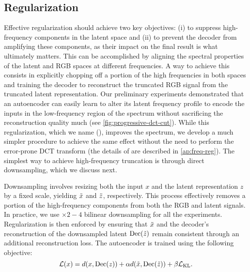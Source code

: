 


\subsection{\Regname Regularization}
\label{sec:method:scalereg}
Effective regularization should achieve two key objectives: (i) to suppress high-frequency components in the latent space and (ii) to prevent the decoder from amplifying these components, as their impact on the final result is what ultimately matters. This can be accomplished by aligning the spectral properties of the latent and RGB spaces at different frequencies.
A way to achieve this consists in explicitly chopping off a portion of the high frequencies in both spaces and training the decoder to reconstruct the truncated RGB signal from the truncated latent representation.
Our preliminary experiments demonstrated that an autoencoder can easily learn to alter its latent frequency profile to encode the inputs in the low-frequency region of the spectrum without sacrificing the reconstruction quality much (see \cref{fig:progressive-dct-cut}).
While this regularization, which we name \regchfname (\regchfshortname), improves the spectrum, we develop a much simpler procedure to achieve the same effect without the need to perform the error-prone DCT transform (the details of \regchfshortname are described in \cref{ap:freq-reg}).
The simplest way to achieve high-frequency truncation is through direct downsampling, which we discuss next.

Downsampling involves resizing both the input  $x$ and the latent representation $z$ by a fixed scale, yielding $\Tilde{x}$ and $\Tilde{z}$, respectively.
This process effectively removes a portion of the high-frequency components from both the RGB and latent signals.
In practice, we use $\times 2-4$ bilinear downsampling for all the experiments.
Regularization is then enforced by ensuring that $\Tilde{x}$ and the decoder’s reconstruction of the downsampled latent $\operatorname{Dec}(\Tilde{z})$ remain consistent through an additional reconstruction loss.
The autoencoder is trained using the following objective:  
\begin{equation}\label{eq:loss}
\mathcal{L}(x) = d(x, \operatorname{Dec}(z)) + \alpha d( \Tilde{x}, \operatorname{Dec}(\Tilde{z}) ) + \beta\mathcal{L}_\text{KL}.  
\end{equation}  

